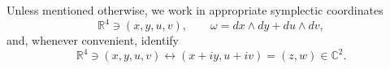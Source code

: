 \documentclass{article}
\newcommand{\R}{\mathbb{R}} %
\newcommand{\C}{\mathbb{C}} %
\begin{document}


Unless mentioned otherwise, we work in appropriate symplectic coordinates
\begin{equation}
\label{eq:StdSymp}
    \R^4\ni(x,y,u,v),\qquad \omega=dx\wedge dy+du\wedge dv,
\end{equation}
and, whenever convenient, identify 
\begin{equation}\label{eq:CplxCoord}
    \R^4\ni (x,y,u,v)\longleftrightarrow(x+iy,u+iv)=(z,w)\in \C^2.
\end{equation}
\end{document}
